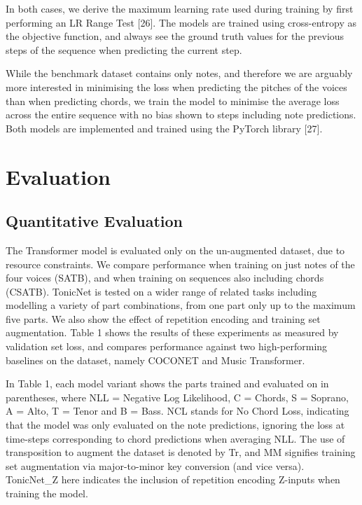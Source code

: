 \documentclass{article}
\begin{document}
In both cases, we derive the maximum learning rate used during training by first performing an LR Range Test [26]. The models are trained using cross-entropy as the objective function, and always see the ground truth values for the previous steps of the sequence when predicting the current step.

While the benchmark dataset contains only notes, and therefore we are arguably more interested in minimising the loss when predicting the pitches of the voices than when predicting chords, we train the model to minimise the average loss across the entire sequence with no bias shown to steps including note predictions. Both models are implemented and trained using the PyTorch library [27].

\section{Evaluation}\label{sec:eval}

\subsection{Quantitative Evaluation}\label{subsec:quant_eval}

The Transformer model is evaluated only on the un-augmented dataset, due to resource constraints. We compare performance when training on just notes of the four voices (SATB), and when training on sequences also including chords (CSATB). TonicNet is tested on a wider range of related tasks including modelling a variety of part combinations, from one part only up to the maximum five parts. We also show the effect of repetition encoding and training set augmentation. Table 1 shows the results of these experiments as measured by validation set loss, and compares performance against two high-performing baselines on the dataset, namely COCONET and Music Transformer.

In Table 1, each model variant shows the parts trained and evaluated on in parentheses, where NLL = Negative Log Likelihood, C = Chords, S = Soprano, A = Alto, T = Tenor and B = Bass. NCL stands for No Chord Loss, indicating that the model was only evaluated on the note predictions, ignoring the loss at time-steps corresponding to chord predictions when averaging NLL. The use of transposition to augment the dataset is denoted by Tr, and MM signifies training set augmentation via major-to-minor key conversion (and vice versa). TonicNet\_Z here indicates the inclusion of repetition encoding Z-inputs when training the model.
\end{document}
